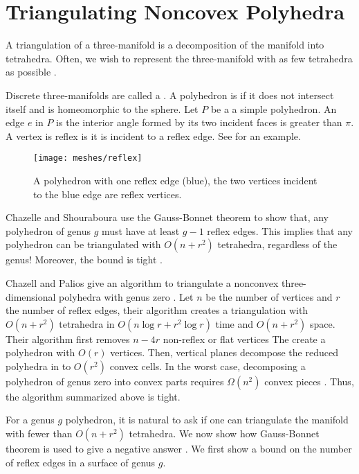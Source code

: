 \section{Triangulating Noncovex Polyhedra}
\label{sec:triangulating}

A triangulation of a three-manifold is a decomposition
of the manifold into tetrahedra.
Often, we wish to represent the three-manifold
with as few tetrahedra as possible \cite{simplify-mesh-1999}.

Discrete three-manifolds are called a . 
A polyhedron is  if it does not intersect itself and is homeomorphic to the sphere.
Let $P$ be a a simple polyhedron. An edge $e$ in $P$ is
 the interior angle formed by its two incident faces
is greater than $\pi$.
A vertex is reflex is it is incident to a reflex edge.
See  for an example.

\begin{figure}[htb]
\centering
\texttt{[image: meshes/reflex]}
\caption{A polyhedron with one reflex edge (blue), the two vertices incident to the blue
edge are reflex vertices.}
\label{fig:reflex}
\end{figure}


Chazelle and Shouraboura use the 
 Gauss-Bonnet theorem to show that, any polyhedron
 of genus $g$ must have at least $g-1$ reflex edges.
 This implies that any polyhedron
can be triangulated with $O(n+r^2)$ tetrahedra, regardless  of 
the genus! Moreover, the bound is tight \cite{tetra-bounds-c-s-1994}.


Chazell and Palios give an
algorithm to triangulate a nonconvex three-dimensional polyhedra with genus
zero \cite{triangulating-polytope-1990}.
Let $n$ be the number of vertices and $r$ the number of reflex edges,
 their algorithm creates a triangulation with $O(n+r^2)$ tetrahedra 
in $O(n\log r +r^2\log r)$ time and $O(n+r^2)$ space.
Their algorithm first removes $n-4r$ non-reflex or flat vertices
The create a polyhedron with $O(r)$ vertices.
Then, vertical planes decompose the reduced polyhedra in to
$O(r^2)$ convex cells.
In the worst case, decomposing a polyhedron of genus
zero into convex parts requires $\Omega(n^2)$ convex pieces
\cite{chazelle-lower-1984}.
Thus, the algorithm summarized above is tight.


For a genus $g$ polyhedron, it is natural to ask if one can 
triangulate the manifold with fewer than $O(n+r^2)$ tetrahedra.
We now show how Gauss-Bonnet theorem is used to give a negative answer 
 \cite{tetra-bounds-c-s-1994}.
We first show a bound on the number of reflex edges
in a surface of genus $g$.


